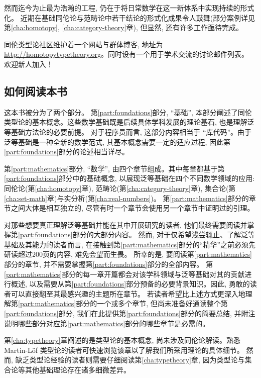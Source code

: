 %
然而迄今为止最为浩瀚的工程, 仍在于将日常数学在这一新体系中实现持续的形式化。
近期在基础同伦论与范畴论中若干结论的形式化成果令人鼓舞(部分案例详见第\ref{cha:homotopy}, \ref{cha:category-theory}章),
但显然, 还有许多工作亟待完成。

%

同伦类型论社区维护着一个网站与群体博客, 地址为 \url{http://homotopytypetheory.org}。同时设有一个用于学术交流的讨论邮件列表。
欢迎新人加入！

\subsection*{如何阅读本书}

这本书被分为了两个部分。
第\ref{part:foundations}部分, ``基础'', 本部分阐述了同伦类型论的基本概念。这些数学基础既是后续具体学科发展的理论基石, 也是理解泛等基础方法论的必要前提。
对于程序员而言, 这部分内容相当于 ``库代码''。由于泛等基础是一种全新的数学范式, 其基本概念需要一定的适应过程, 因此第\ref{part:foundations}部分的论述相当详尽。

第\ref{part:mathematics}部分, ``数学'', 由四个章节组成。其中每章都基于第\ref{part:foundations}部分中的基础概念,
以展现泛等基础在四个不同数学领域的应用: 同伦论(第\ref{cha:homotopy}章), 范畴论(第\ref{cha:category-theory}章), 集合论(第\ref{cha:set-math}章)与实分析(第\ref{cha:real-numbers})。
第\ref{part:mathematics}部分的章节之间大体是相互独立的, 尽管有时一个章节会使用另一个章节中证明过的引理。

对那些想要真正理解泛等基础并能在其中开展研究的读者, 他们最终需要阅读并掌握第\ref{part:foundations}部分的大部分内容。
然而, 对于仅希望浅尝辄止、了解泛等基础及其能力的读者而言, 在接触到第\ref{part:mathematics}部分的``精华''之前必须先研读超过200页的内容, 难免会望而生畏。
所幸的是, 要阅读第\ref{part:mathematics}部分的章节, 并不需要掌握第\ref{part:foundations}部分的全部内容。
第\ref{part:mathematics}部分的每一章开篇都会对该学科领域与泛等基础对其的贡献进行概述,
以及需要从第\ref{part:foundations}部分预备的必要背景知识。因此, 勇敢的读者可以直接翻至其最感兴趣的主题所在章节。
若读者希望比上述方式更深入地理解第\ref{part:mathematics}部分的一个或多个章节, 但尚未准备好通读整个第\ref{part:foundations}部分, 
我们在此提供第\ref{part:foundations}部分的简要总结, 并附注说明哪些部分对应第\ref{part:mathematics}部分的哪些章节是必需的。

第\ref{cha:typetheory}章阐述的是类型论的基本概念, 尚未涉及同伦论解读。熟悉 Martin-L\"of 类型论的读者可快速浏览该章以了解我们所采用理论的具体细节。
然而, 缺乏类型论经验的读者则需要仔细阅读第\ref{cha:typetheory}章, 因为类型论与集合论等其他基础理论存在诸多细微差异。

